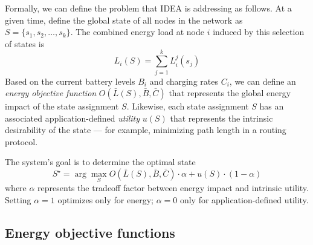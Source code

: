 Formally, we can define the problem that IDEA is addressing as
follows. At a given time, define the global state of all nodes
in the network as $S = \{ s_1, s_2, \ldots, s_k \}$.
The combined energy load at node $i$ induced by this selection of
states is
\[ L_i(S) = \sum_{j=1}^k L_i^j(s_j) \]
Based on the current
battery levels $B_i$ and charging rates $C_i$, we can define an 
{\em energy objective function} $O(\bar{L}(S), \bar{B}, \bar{C})$ that represents
the global energy impact of the state assignment $S$.
Likewise, each state assignment $S$ has an associated 
application-defined {\em utility} $u(S)$ that represents the
intrinsic desirability of the state --- for example, minimizing path
length in a routing protocol. 

The system's goal is to determine the optimal state 
\[
S^\star = \arg \max_{S} O(\bar{L}(S), \bar{B}, \bar{C}) \cdot \alpha + u(S) \cdot (1-\alpha)\]
where $\alpha$ represents the tradeoff factor between energy impact and
intrinsic utility. Setting $\alpha=1$ optimizes only for energy;
$\alpha=0$ only for application-defined utility.

\subsection{Energy objective functions}
\label{subsec-energyobjectivefunctions}

